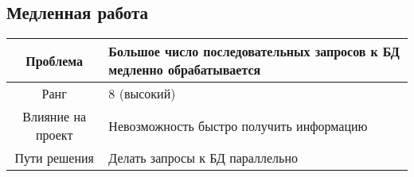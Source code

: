 \documentclass[pdftex,12pt,a4paper]{report}
\begin{document}
\subsection{Медленная работа}
\begin{table}[h]
\begin{tabular}{|c|p{10cm}|} \hline
\cellcolor[gray]{0.9} Проблема  & Большое число последовательных запросов к БД медленно обрабатывается \\ \hline
\cellcolor[gray]{0.9} Ранг  & 8 (высокий) \\ \hline
\cellcolor[gray]{0.9} Влияние на проект & Невозможность быстро получить информацию \\ \hline
\cellcolor[gray]{0.9} Пути решения  & Делать запросы к БД параллельно \\ \hline
\end{tabular}
\end{table}
\end{document}
